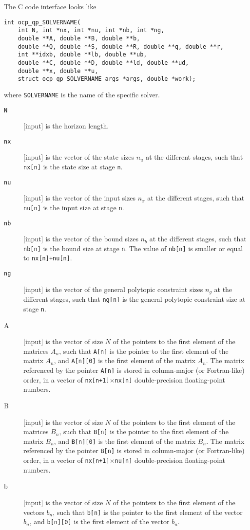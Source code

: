 \documentclass{report}
\begin{document}
The C code interface looks like
\begin{verbatim}
int ocp_qp_SOLVERNAME(
    int N, int *nx, int *nu, int *nb, int *ng, 
    double **A, double **B, double **b, 
    double **Q, double **S, double **R, double **q, double **r, 
    int **idxb, double **lb, double **ub, 
    double **C, double **D, double **ld, double **ud, 
    double **x, double **u,
    struct ocp_qp_SOLVERNAME_args *args, double *work);
\end{verbatim}
where {\tt SOLVERNAME} is the name of the specific solver.
\begin{description}
\item[{\tt N}] [input] is the horizon length.
\item[{\tt nx}] [input] is the vector of the state sizes $n_u$ at the different stages, such that {\tt nx[n]} is the state size at stage {\tt n}.
\item[{\tt nu}] [input] is the vector of the input sizes $n_x$ at the different stages, such that {\tt nu[n]} is the input size at stage {\tt n}.
\item[{\tt nb}] [input] is the vector of the bound sizes $n_b$ at the different stages, such that {\tt nb[n]} is the bound size at stage {\tt n}.
The value of {\tt nb[n]} is smaller or equal to {\tt nx[n]+nu[n]}.
\item[{\tt ng}] [input] is the vector of the general polytopic constraint sizes $n_g$ at the different stages, such that {\tt ng[n]} is the general polytopic constraint size at stage {\tt n}.
\item[A] [input] is the vector of size $N$ of the pointers to the first element of the matrices $A_n$, such that {\tt A[n]} is the pointer to the first element of the matrix $A_n$, and {\tt A[n][0]} is the first element of the matrix $A_n$.
The matrix referenced by the pointer {\tt A[n]} is stored in column-major (or Fortran-like) order, in a vector of {\tt nx[n+1]$\times$nx[n]} double-precision floating-point numbers.
\item[B] [input] is the vector of size $N$ of the pointers to the first element of the matrices $B_n$, such that {\tt B[n]} is the pointer to the first element of the matrix $B_n$, and {\tt B[n][0]} is the first element of the matrix $B_n$.
The matrix referenced by the pointer {\tt B[n]} is stored in column-major (or Fortran-like) order, in a vector of {\tt nx[n+1]$\times$nu[n]} double-precision floating-point numbers.
\item[b] [input] is the vector of size $N$ of the pointers to the first element of the vectors $b_n$, such that {\tt b[n]} is the pointer to the first element of the vector $b_n$, and {\tt b[n][0]} is the first element of the vector $b_n$.

\end{description}
\end{document}
